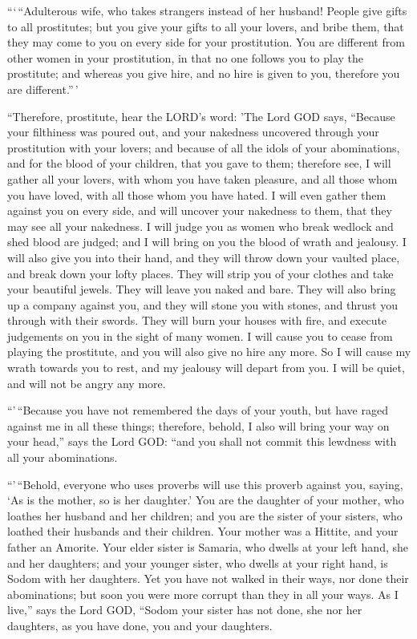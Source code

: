  ```\,``Adulterous wife, who takes strangers instead of her
husband!  People give gifts to all prostitutes; but you
give your gifts to all your lovers, and bribe them, that they may come
to you on every side for your prostitution.  You are
different from other women in your prostitution, in that no one follows
you to play the prostitute; and whereas you give hire, and no hire is
given to you, therefore you are different.''\,'

 ``Therefore, prostitute, hear the LORD's word:
 'The Lord GOD says, ``Because your filthiness was poured
out, and your nakedness uncovered through your prostitution with your
lovers; and because of all the idols of your abominations, and for the
blood of your children, that you gave to them;  therefore
see, I will gather all your lovers, with whom you have taken pleasure,
and all those whom you have loved, with all those whom you have hated. I
will even gather them against you on every side, and will uncover your
nakedness to them, that they may see all your nakedness.  I
will judge you as women who break wedlock and shed blood are judged; and
I will bring on you the blood of wrath and jealousy.  I
will also give you into their hand, and they will throw down your
vaulted place, and break down your lofty places. They will strip you of
your clothes and take your beautiful jewels. They will leave you naked
and bare.  They will also bring up a company against you,
and they will stone you with stones, and thrust you through with their
swords.  They will burn your houses with fire, and execute
judgements on you in the sight of many women. I will cause you to cease
from playing the prostitute, and you will also give no hire any more.
 So I will cause my wrath towards you to rest, and my
jealousy will depart from you. I will be quiet, and will not be angry
any more.

 ``'\,``Because you have not remembered the days of your
youth, but have raged against me in all these things; therefore, behold,
I also will bring your way on your head,'' says the Lord GOD: ``and you
shall not commit this lewdness with all your abominations.

 ``'\,``Behold, everyone who uses proverbs will use this
proverb against you, saying, `As is the mother, so is her daughter.'
 You are the daughter of your mother, who loathes her
husband and her children; and you are the sister of your sisters, who
loathed their husbands and their children. Your mother was a Hittite,
and your father an Amorite.  Your elder sister is Samaria,
who dwells at your left hand, she and her daughters; and your younger
sister, who dwells at your right hand, is Sodom with her daughters.
 Yet you have not walked in their ways, nor done their
abominations; but soon you were more corrupt than they in all your ways.
 As I live,'' says the Lord GOD, ``Sodom your sister has
not done, she nor her daughters, as you have done, you and your
daughters.


